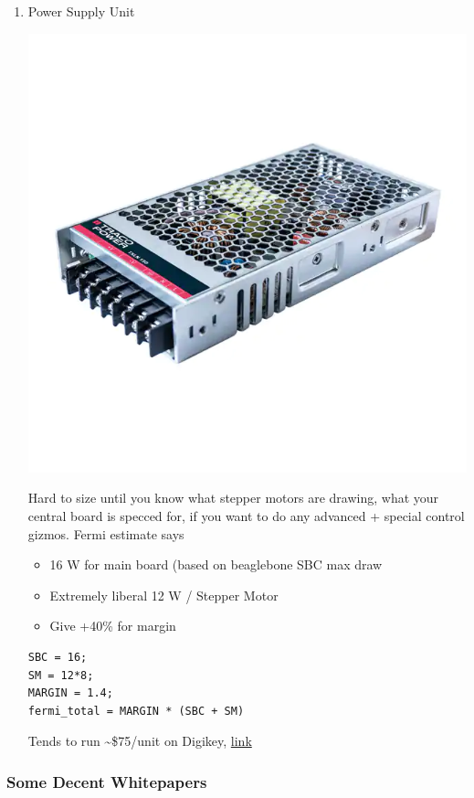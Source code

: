 \documentclass[11pt]{article}
\begin{document}
\begin{enumerate}
\item Power Supply Unit
\label{sec:org5a04865}
\begin{center}
\includegraphics[width=.9\linewidth]{Power_Supply_Unit/2022-07-18_14-27-16_screenshot.png}
\end{center}
Hard to size until you know what stepper motors are drawing, what your central board is specced for, if you want to do any advanced + special control gizmos. Fermi estimate says
\begin{itemize}
\item 16 W for main board (based on beaglebone SBC max draw
\item Extremely liberal 12 W / Stepper Motor
\item Give +40\% for margin
\end{itemize}
\begin{verbatim}
SBC = 16;
SM = 12*8;
MARGIN = 1.4;
fermi_total = MARGIN * (SBC + SM)
\end{verbatim}
Tends to run \textasciitilde{}\$75/unit on Digikey, \href{https://www.digikey.com/en/products/detail/traco-power/TXLN-150-124/13681763}{link}
\end{enumerate}

\subsubsection{Some Decent Whitepapers}
\label{sec:org29513b8}
\end{document}
